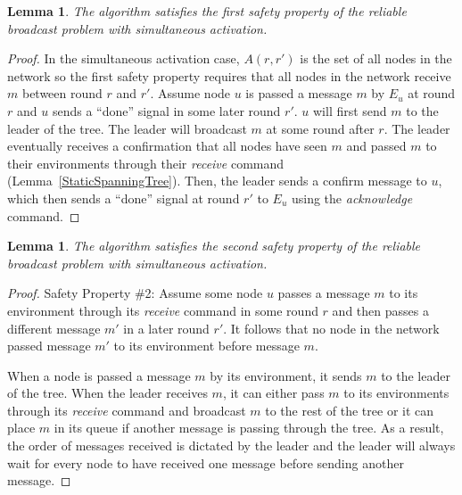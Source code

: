 \documentclass[english]{article}
\newtheorem{lemma}[theorem]{Lemma}
\begin{document}
\begin{lemma}
\label{StaticRBSafety1}
The algorithm satisfies the first safety property of the reliable broadcast problem with simultaneous activation.
\end{lemma}
\begin{proof}

In the simultaneous activation case, $A(r,r')$ is the set of all nodes in the network so the first safety property requires that all nodes in the network receive $m$ between round $r$ and $r'$. Assume node $u$ is passed a message $m$ by $E_u$ at round $r$ and $u$ sends  a ``done'' signal in some later round $r'$. $u$ will first send $m$ to the leader of the tree. The leader will broadcast $m$ at some round after $r$. The leader eventually receives a confirmation that all nodes have seen $m$ and passed $m$ to their environments through their \textit{receive} command (Lemma~\ref{StaticSpanningTree}). Then, the leader sends a confirm message to $u$, which then sends  a ``done'' signal at round $r'$ to $E_u$ using the \textit{acknowledge} command. 

\end{proof}


\begin{lemma}
\label{StaticRBSafety2}
The algorithm satisfies the second safety property of the reliable broadcast problem with simultaneous activation.
\end{lemma}
\begin{proof}
Safety Property \#2: Assume some node $u$ passes a message $m$ to its environment through its \textit{receive} command in some round $r$ and then passes a different message $m'$ in a later round $r'$. It follows that no node in the network passed message $m'$ to its environment before message $m$. 

When a node is passed a message $m$ by its environment, it sends $m$ to the leader of the tree. When the leader receives $m$, it can either pass $m$ to its environments through its \textit{receive} command and broadcast $m$ to the rest of the tree or it can place $m$ in its queue if another message is passing through the tree. As a result, the order of messages received is dictated by the leader and the leader will always wait for every node to have received one message before sending another message. 
\end{proof}
\end{document}
